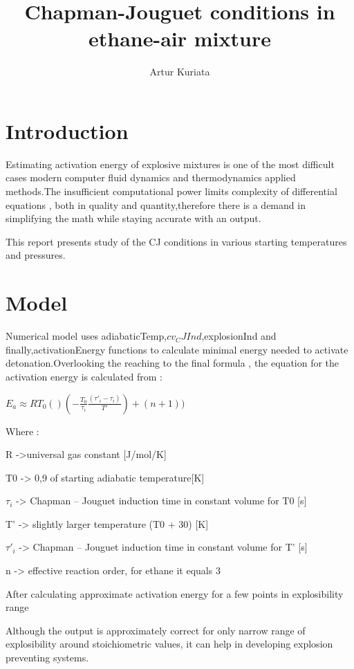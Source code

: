 \documentclass[a4paper]{article}
\title{Chapman-Jouguet conditions in ethane-air mixture}
\author{Artur Kuriata}
\begin{document}
\maketitle


\section{Introduction}

Estimating activation energy of explosive mixtures is one of the most difficult cases modern computer fluid dynamics and thermodynamics applied methods.The insufficient computational power limits complexity of differential equations , both in quality and quantity,therefore there is a demand in simplifying  the math while staying accurate with an output.



This report presents study of the CJ conditions in various starting temperatures and pressures.

\section{Model}
Numerical model uses  adiabaticTemp,$cv_CJInd$,explosionInd and finally,activationEnergy
functions to calculate minimal energy needed to activate detonation.Overlooking the reaching to the final formula , the equation for the activation energy is calculated from :

\(E_{a}\approx RT_{0}()(-\frac{T_{0}}{\tau _{i}}\frac{(\tau'_{i}-\tau_{i})}{T'}) +(n+1))\)





Where :

R	->universal gas constant [J/mol/K]

T0 -> 0,9 of starting adiabatic temperature[K]

\( \tau_{i}\) -> Chapman – Jouguet induction time in constant volume for T0 [s]

T’ -> slightly larger temperature (T0 + 30) [K]


\( \tau'_{i}\) -> Chapman – Jouguet induction time in constant volume for T’ [s]


n -> effective reaction order, for ethane it equals 3


After calculating approximate activation energy for a few points in explosibility range



Although the output is approximately correct for only narrow range of explosibility around stoichiometric values, it can help in developing explosion preventing systems.
\end{document}

